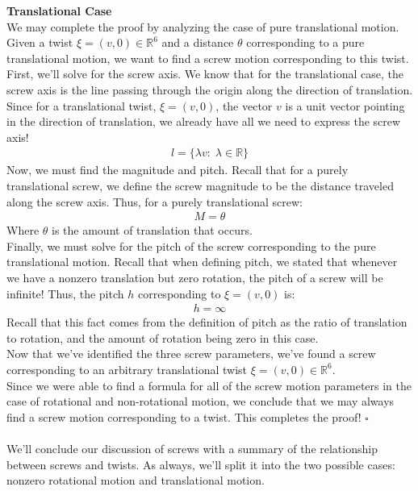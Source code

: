 \documentclass[oneside]{book}
\begin{document}
\textbf{Translational Case}\\
We may complete the proof by analyzing the case of pure translational motion. Given a twist $\xi = (v, 0) \in \mathbb{R}^6$ and a distance $\theta$ corresponding to a pure translational motion, we want to find a screw motion corresponding to this twist.\\
First, we'll solve for the screw axis. We know that for the translational case, the screw axis is the line passing through the origin along the direction of translation. Since for a translational twist, $\xi = (v, 0)$, the vector $v$ is a unit vector pointing in the direction of translation, we already have all we need to express the screw axis!
\begin{align}
    l = \{ \lambda v:\; \lambda \in \mathbb{R} \}
\end{align}
Now, we must find the magnitude and pitch. Recall that for a purely translational screw, we define the screw magnitude to be the distance traveled along the screw axis. Thus, for a purely translational screw:
\begin{align}
    M = \theta
\end{align}
Where $\theta$ is the amount of translation that occurs.\\
Finally, we must solve for the pitch of the screw corresponding to the pure translational motion. Recall that when defining pitch, we stated that whenever we have a nonzero translation but zero rotation, the pitch of a screw will be infinite! Thus, the pitch $h$ corresponding to $\xi = (v, 0)$ is:
\begin{align}
    h = \infty
\end{align}
Recall that this fact comes from the definition of pitch as the ratio of translation to rotation, and the amount of rotation being zero in this case.\\
Now that we've identified the three screw parameters, we've found a screw corresponding to an arbitrary translational twist $\xi = (v, 0) \in \mathbb{R}^6$.\\
Since we were able to find a formula for all of the screw motion parameters in the case of rotational and non-rotational motion, we conclude that we may always find a screw motion corresponding to a twist. This completes the proof! $\square$\\\\
We'll conclude our discussion of screws with a summary of the relationship between screws and twists. As always, we'll split it into the two possible cases: nonzero rotational motion and translational motion.
\end{document}
